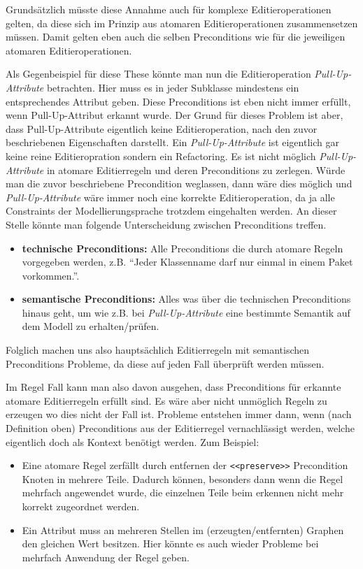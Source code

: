 Grundsätzlich müsste diese Annahme auch für komplexe Editieroperationen gelten, da diese sich im
Prinzip aus atomaren Editieroperationen zusammensetzen müssen. Damit gelten eben auch die selben
Preconditions wie für die jeweiligen atomaren Editieroperationen.

Als Gegenbeispiel für diese These könnte man nun die Editieroperation \textit{Pull-Up-Attribute}
betrachten. Hier muss es in jeder Subklasse mindestens ein entsprechendes Attribut geben. Diese
Preconditions ist eben nicht immer erfüllt, wenn Pull-Up-Attribut erkannt wurde. Der Grund für
dieses Problem ist aber, dass Pull-Up-Attribute eigentlich keine Editieroperation, nach den zuvor
beschriebenen Eigenschaften darstellt. Ein \textit{Pull-Up-Attribute} ist eigentlich gar keine reine
Editieropration sondern ein Refactoring. Es ist nicht möglich \textit{Pull-Up-Attribute} in atomare
Editierregeln und deren Preconditions zu zerlegen. Würde man die zuvor beschriebene Precondition
weglassen, dann wäre dies möglich und \textit{Pull-Up-Attribute} wäre immer noch eine korrekte
Editieroperation, da ja alle Constraints der Modellierungsprache trotzdem eingehalten werden. An
dieser Stelle könnte man folgende Unterscheidung zwischen Preconditions treffen.

\begin{itemize}
  \item \textbf{technische Preconditions:} Alle Preconditions die durch atomare Regeln vorgegeben
  werden, z.B. "`Jeder Klassenname darf nur einmal in einem Paket vorkommen."'.
  \item \textbf{semantische Preconditions:} Alles was über die technischen Preconditions hinaus
  geht, um wie z.B. bei \textit{Pull-Up-Attribute} eine bestimmte Semantik auf dem Modell zu
  erhalten/prüfen.
\end{itemize}

Folglich machen uns also hauptsächlich Editierregeln mit semantischen Preconditions Probleme, da
diese auf jeden Fall überprüft werden müssen.

Im Regel Fall kann man also davon ausgehen, dass Preconditions für erkannte atomare Editierregeln
erfüllt sind. Es wäre aber nicht unmöglich Regeln zu erzeugen wo dies nicht der Fall ist. Probleme
entstehen immer dann, wenn (nach Definition oben) Preconditions aus der Editierregel vernachlässigt
werden, welche eigentlich doch als Kontext benötigt werden. Zum Beispiel:

\begin{itemize}
  \item Eine atomare Regel zerfällt durch entfernen der \texttt{<<preserve>>} Precondition Knoten in
  mehrere Teile. Dadurch können, besonders dann wenn die Regel mehrfach angewendet wurde, die
  einzelnen Teile beim erkennen nicht mehr korrekt zugeordnet werden.
  \item Ein Attribut muss an mehreren Stellen im (erzeugten/entfernten) Graphen den gleichen Wert
  besitzen. Hier könnte es auch wieder Probleme bei mehrfach Anwendung der Regel geben.
\end{itemize}

